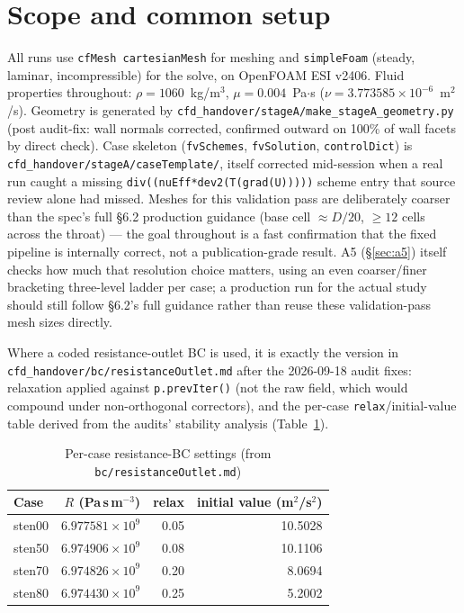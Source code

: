\documentclass[11pt]{article}
\begin{document}
\section{Scope and common setup}
All runs use \texttt{cfMesh cartesianMesh} for meshing and \texttt{simpleFoam} (steady, laminar,
incompressible) for the solve, on OpenFOAM ESI v2406. Fluid properties throughout:
$\rho = 1060$~kg/m$^3$, $\mu = 0.004$~Pa$\cdot$s ($\nu = 3.773585\times10^{-6}$~m$^2$/s). Geometry
is generated by \texttt{cfd\_\allowbreak{}handover/\allowbreak{}stageA/\allowbreak{}make\_\allowbreak{}stageA\_\allowbreak{}geometry.py} (post audit-fix: wall
normals corrected, confirmed outward on 100\% of wall facets by direct check). Case skeleton
(\texttt{fvSchemes}, \texttt{fvSolution}, \texttt{controlDict}) is
\texttt{cfd\_\allowbreak{}handover/\allowbreak{}stageA/\allowbreak{}caseTemplate/\allowbreak{}}, itself corrected mid-session when a real run caught a
missing \texttt{div((nuEff*dev2(T(grad(U)))))} scheme entry that source review alone had missed.
Meshes for this validation pass are deliberately coarser than the spec's full \S6.2 production
guidance (base cell $\approx D/20$, $\geq12$ cells across the throat) --- the goal throughout is a
fast confirmation that the fixed pipeline is internally correct, not a publication-grade result. A5
(\S\ref{sec:a5}) itself checks how much that resolution choice matters, using an even coarser/finer
bracketing three-level ladder per case; a production run for the actual study should still follow
\S6.2's full guidance rather than reuse these validation-pass mesh sizes directly.

Where a coded resistance-outlet BC is used, it is exactly the version in
\texttt{cfd\_\allowbreak{}handover/\allowbreak{}bc/\allowbreak{}resistanceOutlet.md} after the 2026-09-18 audit fixes: relaxation applied
against \texttt{p.prevIter()} (not the raw field, which would compound under non-orthogonal
correctors), and the per-case \texttt{relax}/initial-value table derived from the audits' stability
analysis (Table~\ref{tab:relax}).

\begin{table}[h]
\centering
\caption{Per-case resistance-BC settings (from \texttt{bc/\allowbreak{}resistanceOutlet.md})}
\label{tab:relax}
\begin{tabular}{lrrr}
\toprule
Case & $R$ (Pa\,s\,m$^{-3}$) & relax & initial value (m$^2$/s$^2$) \\
\midrule
sten00 & $6.977581\times10^{9}$ & 0.05 & 10.5028 \\
sten50 & $6.974906\times10^{9}$ & 0.08 & 10.1106 \\
sten70 & $6.974826\times10^{9}$ & 0.20 & 8.0694 \\
sten80 & $6.974430\times10^{9}$ & 0.25 & 5.2002 \\
\bottomrule
\end{tabular}
\end{table}
\end{document}
